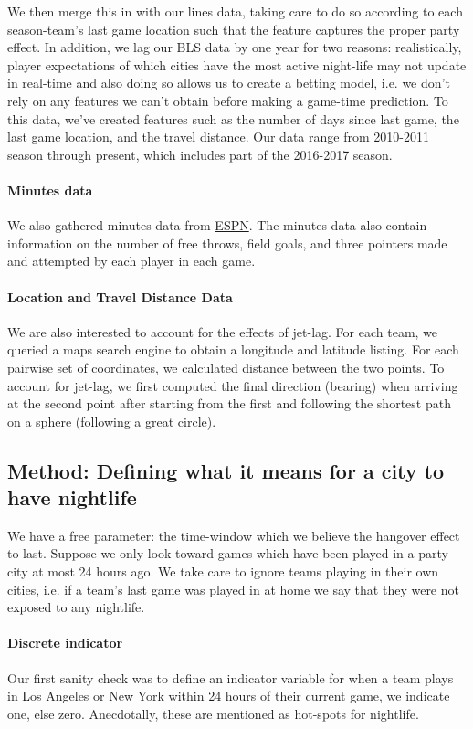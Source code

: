 \documentclass[letterpaper,12pt]{article}
\begin{document}
We then merge this in with our lines data, taking care to do so according to each season-team's last game location such that the feature captures the proper
party effect. In addition, we lag our BLS data by one year for two reasons:
realistically, player expectations of which cities have the most active night-life may not
update in real-time and also doing so allows us to create a betting model, i.e.
we don't rely on any features we can't obtain before making a game-time prediction. 
To this data, we've created features such as 
the number of days since last game, the last game location, and the travel distance. 
Our data range from 2010-2011 season through present, which includes part of the 2016-2017 season.

\paragraph{Minutes data}
We also gathered minutes data from \href{http://www.espn.com/nba/scoreboard/_/date/}{ESPN}.
The minutes data also contain information on the number of free throws, field goals, and three pointers made and attempted by each player in each game.

\paragraph{Location and Travel Distance Data} We are also interested
to account for the effects of jet-lag. For each team, we queried
a maps search engine to obtain a longitude and latitude listing.\cite{ggmap}
For each pairwise set of coordinates, we calculated distance between the two
points.\cite{sp} To account for jet-lag, we first computed the final direction 
(bearing) when arriving at the 
second point after starting from the first and following the shortest path on a sphere 
(following a great circle).\cite{lallensack}

\subsection{Method: Defining what it means for a city to have nightlife}
We have a free parameter: the time-window which we believe the hangover effect
to last. Suppose we only look toward games which have been played in a party
city at most 24 hours ago. We take care to ignore
teams playing in their own cities, i.e. if a team's last game was played in at home 
we say that they were not exposed to any nightlife.

\paragraph{Discrete indicator}
Our first sanity check was to define an indicator variable for when a team plays in 
Los Angeles or New York within 24 hours of their current game, we indicate one, else zero. Anecdotally, these are mentioned as hot-spots for
nightlife.
\end{document}
